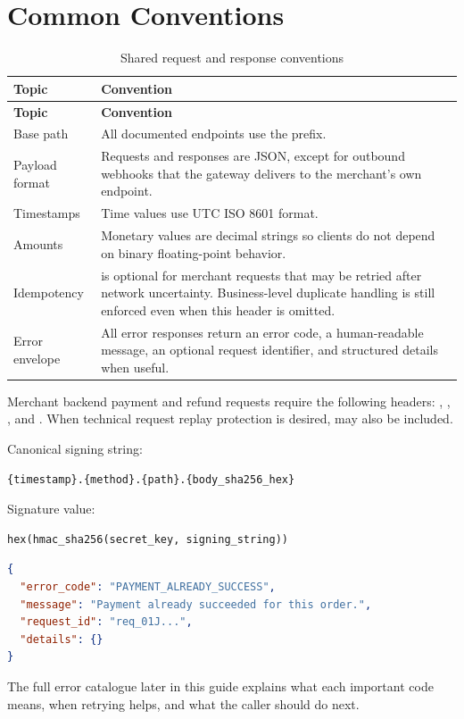 \section{Common Conventions}

\begin{longtable}{@{}L{0.27\textwidth}L{0.63\textwidth}@{}}
\caption{Shared request and response conventions}\\
\toprule
\textbf{Topic} & \textbf{Convention} \\
\midrule
\endfirsthead
\toprule
\textbf{Topic} & \textbf{Convention} \\
\midrule
\endhead
Base path & All documented endpoints use the  prefix. \\
\bodyrowrule
Payload format & Requests and responses are JSON, except for outbound webhooks
that the gateway delivers to the merchant's own endpoint. \\
\bodyrowrule
Timestamps & Time values use UTC ISO 8601 format. \\
\bodyrowrule
Amounts & Monetary values are decimal strings so clients do not depend on
binary floating-point behavior. \\
\bodyrowrule
Idempotency &  is optional for merchant requests that
may be retried after network uncertainty. Business-level duplicate handling is
still enforced even when this header is omitted. \\
\bodyrowrule
Error envelope & All error responses return an error code, a human-readable
message, an optional request identifier, and structured details when useful. \\
\bottomrule
\end{longtable}

Merchant backend payment and refund requests require the following headers:
, , , and
. When technical request replay protection is desired,
 may also be included.

Canonical signing string:

\begin{lstlisting}[caption={Merchant HMAC signing string}]
{timestamp}.{method}.{path}.{body_sha256_hex}
\end{lstlisting}

Signature value:

\begin{lstlisting}[caption={Merchant HMAC signature}]
hex(hmac_sha256(secret_key, signing_string))
\end{lstlisting}

\begin{lstlisting}[language=json,caption={Error response example}]
{
  "error_code": "PAYMENT_ALREADY_SUCCESS",
  "message": "Payment already succeeded for this order.",
  "request_id": "req_01J...",
  "details": {}
}
\end{lstlisting}

The full error catalogue later in this guide explains what each important code
means, when retrying helps, and what the caller should do next.
